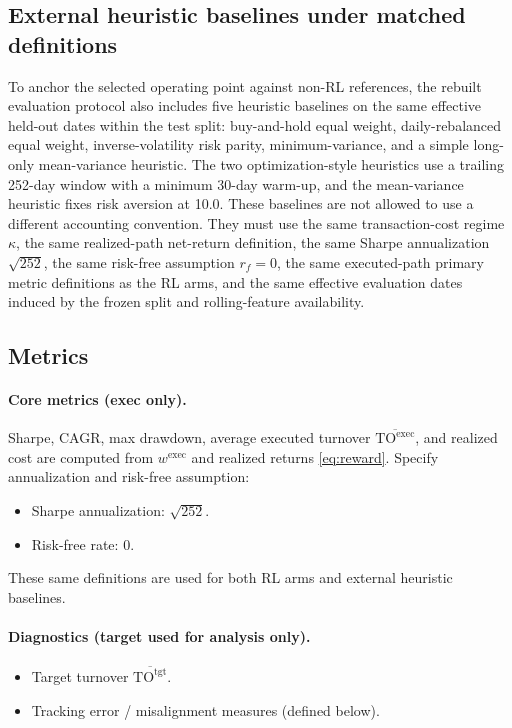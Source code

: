 \documentclass[10pt,twocolumn]{article}
\newcommand{\wexec}{w^{\mathrm{exec}}}
\newcommand{\TOexec}{\mathrm{TO}^{\mathrm{exec}}}
\newcommand{\TOtgt}{\mathrm{TO}^{\mathrm{tgt}}}
\newcommand{\kappaTC}{\kappa}
\begin{document}
\subsection{External heuristic baselines under matched definitions}
To anchor the selected operating point against non-RL references, the rebuilt evaluation protocol also includes five heuristic baselines on the same effective held-out dates within the test split: buy-and-hold equal weight, daily-rebalanced equal weight, inverse-volatility risk parity, minimum-variance, and a simple long-only mean-variance heuristic. The two optimization-style heuristics use a trailing 252-day window with a minimum 30-day warm-up, and the mean-variance heuristic fixes risk aversion at 10.0. These baselines are not allowed to use a different accounting convention. They must use the same transaction-cost regime $\kappaTC$, the same realized-path net-return definition, the same Sharpe annualization $\sqrt{252}$, the same risk-free assumption $r_f=0$, the same executed-path primary metric definitions as the RL arms, and the same effective evaluation dates induced by the frozen split and rolling-feature availability.

\subsection{Metrics}
\paragraph{Core metrics (exec only).}
Sharpe, CAGR, max drawdown, average executed turnover $\overline{\TOexec}$, and realized cost are computed from $\wexec$ and realized returns \eqref{eq:reward}. Specify annualization and risk-free assumption:
\begin{itemize}[leftmargin=*,itemsep=1pt]
\item Sharpe annualization: $\sqrt{252}$.
\item Risk-free rate: 0.
\end{itemize}
These same definitions are used for both RL arms and external heuristic baselines.

\paragraph{Diagnostics (target used for analysis only).}
\begin{itemize}[leftmargin=*,itemsep=1pt]
\item Target turnover $\overline{\TOtgt}$.
\item Tracking error / misalignment measures (defined below).
\end{itemize}
\end{document}
